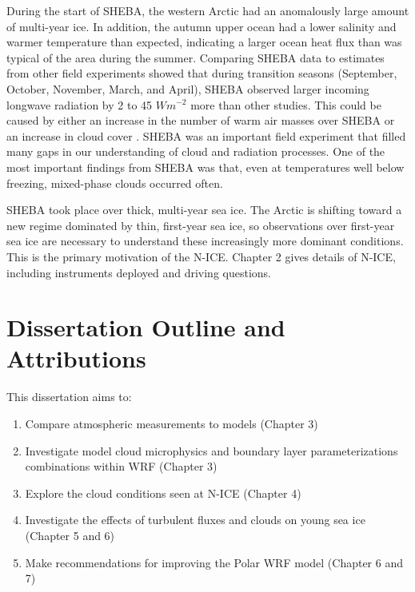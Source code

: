 During the start of SHEBA, the western Arctic had an anomalously large amount of multi-year ice. In addition, the autumn upper ocean had a lower salinity and warmer temperature than expected, indicating a larger ocean heat flux than was typical of the area during the summer. Comparing SHEBA data to estimates from other field experiments showed that during transition seasons (September, October, November, March, and April), SHEBA observed larger incoming longwave radiation by 2 to 45 $Wm^{-2}$ more than other studies. This could be caused by either an increase in the number of warm air masses over SHEBA or an increase in cloud cover \citep{persson:2002}. SHEBA was an important field experiment that filled many gaps in our understanding of cloud and radiation processes. One of the most important findings from SHEBA was that, even at temperatures well below freezing, mixed-phase clouds occurred often. 

SHEBA took place over thick, multi-year sea ice. The Arctic is shifting toward a new regime dominated by thin, first-year sea ice, so observations over first-year sea ice are necessary to understand these increasingly more dominant conditions. This is the primary motivation of the N-ICE. Chapter 2 gives details of N-ICE, including instruments deployed and driving questions.

\section{Dissertation Outline and Attributions}
\newline 
\noindent This dissertation aims to:
\begin{enumerate}
\item Compare atmospheric measurements to models (Chapter 3)
\item Investigate model cloud microphysics and boundary layer parameterizations combinations within WRF (Chapter 3)
\item Explore the cloud conditions seen at N-ICE (Chapter 4)
\item Investigate the effects of turbulent fluxes and clouds on young sea ice (Chapter 5 and 6)
\item Make recommendations for improving the Polar WRF model (Chapter 6 and 7)
\end{enumerate}

